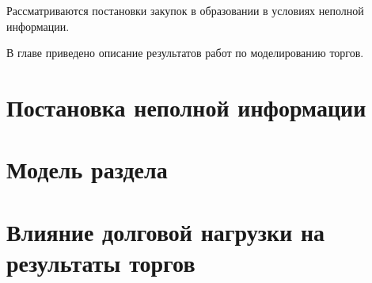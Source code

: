 Рассматриваются постановки закупок в образовании в условиях неполной информации.

В главе приведено описание результатов работ по моделированию торгов.

\section{Постановка неполной информации}


\section{Модель раздела}



\section{Влияние долговой нагрузки на результаты торгов}

